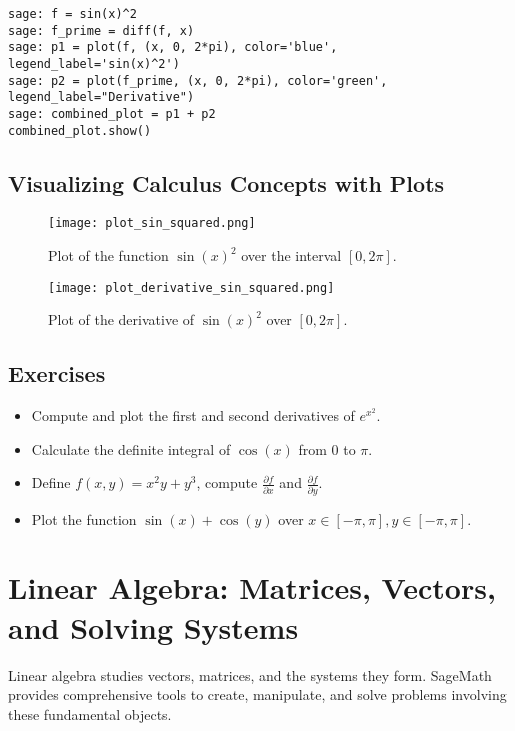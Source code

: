 \documentclass[12pt]{book}
\begin{document}
\begin{verbatim}
sage: f = sin(x)^2
sage: f_prime = diff(f, x)
sage: p1 = plot(f, (x, 0, 2*pi), color='blue', legend_label='sin(x)^2')
sage: p2 = plot(f_prime, (x, 0, 2*pi), color='green', legend_label="Derivative")
sage: combined_plot = p1 + p2
combined_plot.show()
\end{verbatim}

\section{Visualizing Calculus Concepts with Plots}

\begin{figure}[H]
  \centering
  \texttt{[image: plot\_sin\_squared.png]}
  \caption{Plot of the function \( \sin(x)^2 \) over the interval \([0, 2\pi]\).}
  \label{fig:plot_sin_squared}
\end{figure}

\begin{figure}[H]
  \centering
  \texttt{[image: plot\_derivative\_sin\_squared.png]}
  \caption{Plot of the derivative of \( \sin(x)^2 \) over \([0, 2\pi]\).}
  \label{fig:plot_derivative_sin_squared}
\end{figure}

\section{Exercises}

\begin{itemize}
  \item Compute and plot the first and second derivatives of \( e^{x^2} \).
  \item Calculate the definite integral of \( \cos(x) \) from \(0\) to \(\pi\).
  \item Define \( f(x, y) = x^2 y + y^3 \), compute \(\frac{\partial f}{\partial x}\) and \(\frac{\partial f}{\partial y}\).
  \item Plot the function \( \sin(x) + \cos(y) \) over \( x \in [-\pi, \pi], y \in [-\pi, \pi] \).
\end{itemize}

\chapter{Linear Algebra: Matrices, Vectors, and Solving Systems}

Linear algebra studies vectors, matrices, and the systems they form. SageMath provides comprehensive tools to create, manipulate, and solve problems involving these fundamental objects.
\end{document}
